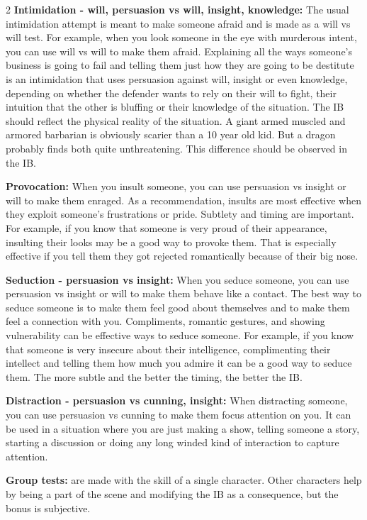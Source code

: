 \begin{multicols}{2}
\textbf{Intimidation - will, persuasion vs will, insight, knowledge:} The usual intimidation attempt is meant to make someone afraid and is made as a will vs will test. For example, when you look someone in the eye with murderous intent, you can use will vs will to make them afraid. Explaining all the ways someone's business is going to fail and telling them just how they are going to be destitute is an intimidation that uses persuasion against will, insight or even knowledge, depending on whether the defender wants to rely on their will to fight, their intuition that the other is bluffing or their knowledge of the situation. The IB should reflect the physical reality of the situation. A giant armed muscled and armored barbarian is obviously scarier than a 10 year old kid. But a dragon probably finds both quite unthreatening. This difference should be observed in the IB.

\textbf{Provocation:} When you insult someone, you can use persuasion vs insight or will to make them enraged. As a recommendation, insults are most effective when they exploit someone's frustrations or pride. Subtlety and timing are important. For example, if you know that someone is very proud of their appearance, insulting their looks may be a good way to provoke them. That is especially effective if you tell them they got rejected romantically because of their big nose. 

\textbf{Seduction - persuasion vs insight:} When you seduce someone, you can use persuasion vs insight or will to make them behave like a contact. The best way to seduce someone is to make them feel good about themselves and to make them feel a connection with you. Compliments, romantic gestures, and showing vulnerability can be effective ways to seduce someone. For example, if you know that someone is very insecure about their intelligence, complimenting their intellect and telling them how much you admire it can be a good way to seduce them. The more subtle and the better the timing, the better the IB.

\textbf{Distraction - persuasion vs cunning, insight:} When distracting someone, you can use persuasion vs cunning to make them focus attention on you. It can be used in a situation where you are just making a show, telling someone a story, starting a discussion or doing any long winded kind of interaction to capture attention. 

\textbf{Group tests:} are made with the skill of a single character. Other characters help by being a part of the scene and modifying the IB as a consequence, but the bonus is subjective.


\end{multicols}
